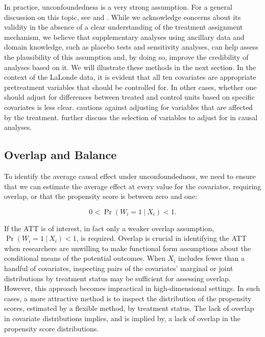 \documentclass[letterpaper,12pt,leqno]{article}
\begin{document}
In practice, unconfoundedness is a very strong assumption. For a general discussion on this topic, see \citet{rosenbaum1983central} and \citet{imbens2004}. While we acknowledge concerns about its validity in the absence of a clear understanding of the treatment assignment mechanism, we believe that supplementary analyses using ancillary data and domain knowledge, such as placebo tests and sensitivity analyses, can help assess the plausibility of this assumption and, by doing so, improve the credibility of analyses based on it. We will illustrate these methods in the next section.
In the context of the LaLonde data, it is evident that all ten covariates are appropriate pretreatment variables that should be controlled for. In other cases, whether one should adjust for differences between treated and control units based on specific covariates is less clear. \citet{rosenbaum1984consequences} cautions against adjusting for variables that are affected by the treatment. \citet{cinelli2022crash} further discuss the selection of variables to adjust for in causal analyses.


\subsection{Overlap and Balance}\label{s:overlap}

To identify the average causal effect under unconfoundedness, we need to ensure that we can estimate the average effect at every value for the covariates, requiring overlap, or that the propensity score is between zero and one:
\begin{assumption}[Overlap]
\label{overlap}
$$0 < \Pr(W_i = 1\ |\ X_i) < 1.$$
\end{assumption}
\noindent If the ATT is of interest, in fact only a weaker overlap assumption, $\Pr(W_i = 1\ |\ X_i) < 1$, is required. Overlap is crucial in identifying the ATT when researchers are unwilling to make functional form assumptions about the conditional means of the potential outcomes. When $X_{i}$ includes fewer than a handful of covariates, inspecting pairs of the covariates' marginal or joint distributions by treatment status may be sufficient for assessing overlap. However, this approach becomes impractical in high-dimensional settings. In such cases, a more attractive method is to inspect the distribution of the propensity scores, estimated by a flexible method, by treatment status. The lack of overlap in covariate distributions implies, and is implied by, a lack of overlap in the propensity score distributions.
\end{document}
